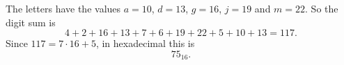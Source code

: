 The letters have the values $a=10$, $d=13$, $g=16$, $j=19$ and $m=22$. So the digit sum is
\[4+2+16+13+7+6+19+22+5+10+13=117 .\]
Since $117=7\cdot16+5$, in hexadecimal this is
\[\boxed{75_{16}}.\]
